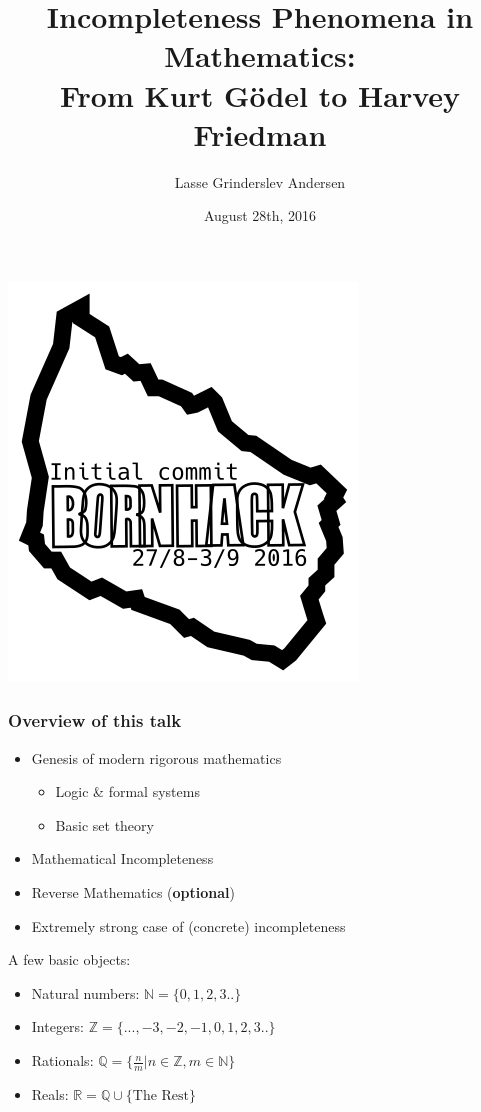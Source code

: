 \documentclass[10pt,danish]{beamer}
\title[Incompleteness phenomena in mathematics]{Incompleteness Phenomena in Mathematics:\\ From Kurt G\"odel to Harvey Friedman}
\author{Lasse Grinderslev Andersen}
\date{August 28th, 2016}
\begin{document}
\begin{frame}
\titlepage
\begin{center}
\includegraphics[scale=0.3]{logo.png}
\end{center}
\end{frame}

\begin{frame}[c]
\frametitle{Overview of this talk}
 \begin{itemize}
  \item Genesis of modern rigorous mathematics
  \begin{itemize}
   \item Logic \& formal systems
   \item Basic set theory
  \end{itemize}
  \item Mathematical Incompleteness
  \item Reverse Mathematics (\textbf{optional})
  \item Extremely strong case of (concrete) incompleteness
 \end{itemize}
\end{frame}

\begin{frame}
A few basic objects:
\begin{itemize}
\item Natural numbers: $\mathbb{N}=\{0,1,2,3..\}$
\item Integers: $\mathbb{Z}=\{..., -3,-2, -1,0,1,2,3..\}$
\item Rationals: $\mathbb{Q}=\{\frac{n}{m}|n \in \mathbb{Z}, m \in \mathbb{N} \}$
\item Reals: $\mathbb{R}=\mathbb{Q} \cup \{ \text{The Rest} \}$
\end{itemize}
\end{frame}
\end{document}
